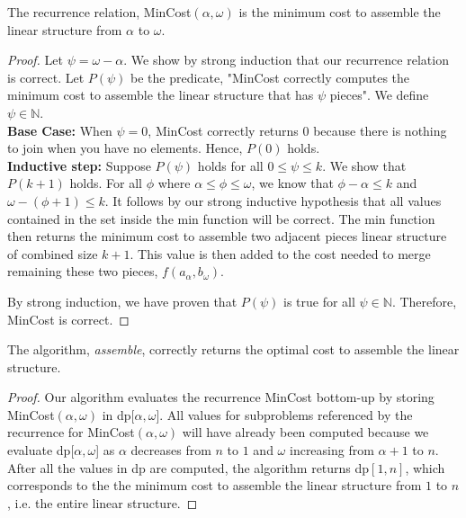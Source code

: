 \documentclass[11pt]{scrartcl}
\begin{document}
\begin{theorem*}
	The recurrence relation, MinCost$(\alpha,\omega)$ is the minimum cost to assemble the linear structure from $\alpha$ to $\omega$.
	\begin{proof}
		Let $\psi = \omega - \alpha$.
		We show by strong induction that our recurrence relation is correct. Let $P(\psi)$ be the predicate,
		"MinCost correctly computes the minimum cost to assemble the linear structure that has $\psi$ pieces".
		We define $\psi \in \mathbb{N}$. \\
		\textbf{Base Case:} When $\psi = 0$, MinCost correctly returns 0 because there is
		nothing to join when you have no elements. Hence, $P(0)$ holds.\\
		\textbf{Inductive step:} Suppose $P(\psi)$ holds for all $0 \leq \psi \leq k$. We show that $P(k + 1)$ holds.
		For all $\phi$ where $\alpha \leq \phi \leq \omega$, we know that $\phi - \alpha \leq k$ and $\omega - (\phi + 1) \leq k$.
		It follows by our strong inductive hypothesis that all values contained in the set inside the min function will be correct.
		The min function then returns the minimum cost to assemble two adjacent pieces linear structure of combined size $k + 1$.
		This value is then added to the cost needed to merge remaining these two pieces, $f(a_\alpha,b_\omega)$.
		\par By strong induction, we have proven that $P(\psi)$ is true for all $\psi  \in \mathbb{N}$.
		Therefore, MinCost is correct.
	\end{proof}
\end{theorem*}

\begin{corollary*}
	The algorithm, \textit{assemble}, correctly returns the optimal cost to assemble the linear structure.

	\begin{proof}
		Our algorithm evaluates the recurrence MinCost bottom-up by storing MinCost$(\alpha,\omega)$ in dp[$\alpha,\omega$].
		All values for subproblems referenced by the recurrence for MinCost$(\alpha,\omega)$ will have already been computed
		because we evaluate dp[$\alpha,\omega$] as $\alpha$ decreases from $n$ to $1$ and $\omega$ increasing from $\alpha + 1$ to $n$.
		After all the values in dp are computed, the algorithm returns dp$[1, n]$,
		which corresponds to the the minimum cost to assemble the linear structure from $1$ to $n$, i.e. the entire linear
		structure.
	\end{proof}

\end{corollary*}
\end{document}

